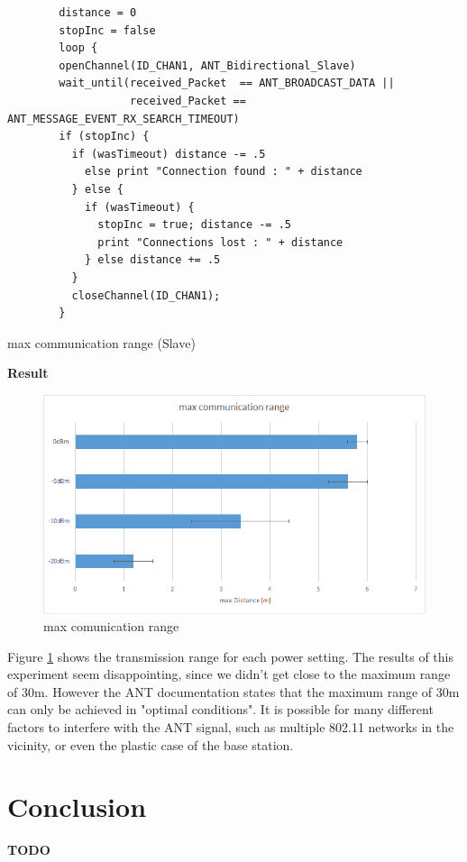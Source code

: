 \begin{description}
	\begin{code}[H]
		\begin{verbatim}
		distance = 0
		stopInc = false
		loop {
		openChannel(ID_CHAN1, ANT_Bidirectional_Slave)
		wait_until(received_Packet  == ANT_BROADCAST_DATA || 
		           received_Packet == ANT_MESSAGE_EVENT_RX_SEARCH_TIMEOUT)
		if (stopInc) { 
		  if (wasTimeout) distance -= .5
		    else print "Connection found : " + distance
		  } else {
		    if (wasTimeout) { 
		      stopInc = true; distance -= .5 
		      print "Connections lost : " + distance
		    } else distance += .5
		  }
  		  closeChannel(ID_CHAN1);		
		}

		\end{verbatim}
		\caption{max communication range (Slave)}\label{lst:sExp6}
	\end{code}
	
	
	\item{\textbf{Result}} \hfill \\ 
	\begin{figure}[H]
		\centering
		\includegraphics[scale=0.5]{./pics/exp6.png}
		\caption{max comunication range}\label{fig:exp6}
	\end{figure}
	Figure \ref{fig:exp6} shows the transmission range for each power setting. The results of this experiment seem disappointing, since we didn't get close to the maximum range of 30m. However the ANT documentation states that the maximum range of 30m can only be achieved in "optimal conditions". It is possible for many different factors to interfere with the ANT signal, such as multiple 802.11 networks in the vicinity, or even the plastic case of the base station. 
\end{description}
\newpage


\chapter{Conclusion}
\textbf{TODO}


